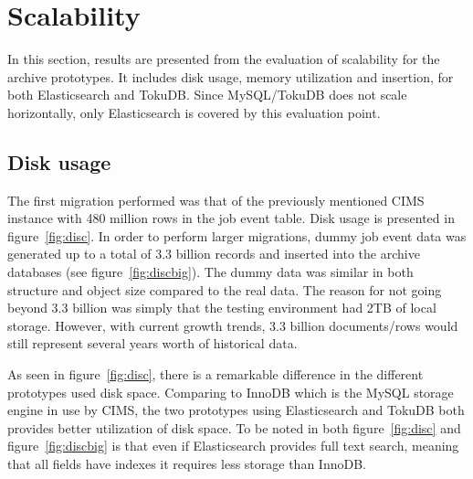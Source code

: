 

\section{Scalability}
In this section, results are presented from the evaluation of scalability for the archive prototypes. It includes disk usage, memory utilization and insertion, for both Elasticsearch and TokuDB. Since MySQL/TokuDB does not scale horizontally, only Elasticsearch is covered by this evaluation point.

\subsection{Disk usage}
The first migration performed was that of the previously mentioned CIMS instance with 480 million rows in the job event table. Disk usage is presented in figure~\ref{fig:disc}. In order to perform larger migrations, dummy job event data was generated up to a total of 3.3 billion records and inserted into the archive databases (see figure~\ref{fig:discbig}). The dummy data was similar in both structure and object size compared to the real data. The reason for not going beyond 3.3 billion was simply that the testing environment had 2TB of local storage. However, with current growth trends, 3.3 billion documents/rows would still represent several years worth of historical data. 

As seen in figure~\ref{fig:disc}, there is a remarkable difference in the different prototypes used disk space. Comparing to InnoDB which is the MySQL storage engine in use by CIMS, the two prototypes using Elasticsearch and TokuDB both provides better utilization of disk space. To be noted in both figure~\ref{fig:disc} and figure~\ref{fig:discbig} is that even if Elasticsearch provides full text search, meaning that all fields have indexes it requires less storage than InnoDB.



